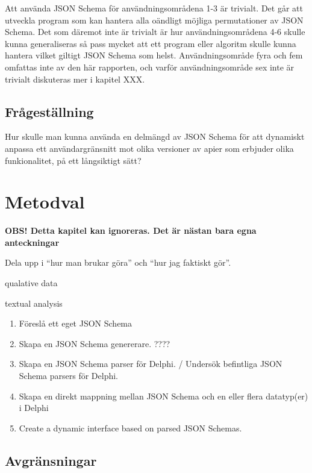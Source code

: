\documentclass[swedish]{kththesis}
\begin{document}
\noindent
Att använda JSON Schema för användningsområdena 1-3 är trivialt. Det går att utveckla program som kan hantera alla oändligt möjliga permutationer av JSON Schema. Det som däremot inte är trivialt är hur användningsområdena 4-6 skulle kunna generaliseras så pass mycket att ett program eller algoritm skulle kunna hantera vilket giltigt JSON Schema som helst. Användningsområde fyra och fem omfattas inte av den här rapporten, och varför användningsområde sex inte är trivialt diskuteras mer i kapitel XXX.




\section{Frågeställning}

Hur skulle man kunna använda en delmängd av JSON Schema för att dynamiskt anpassa ett användargränsnitt mot olika versioner av apier som erbjuder olika funkionalitet, på ett långsiktigt sätt?


\chapter{Metodval}

\textbf{OBS! Detta kapitel kan ignoreras. Det är nästan bara egna anteckningar}

Dela upp i \enquote{hur man brukar göra} och \enquote{hur jag faktiskt gör}.

qualative data

textual analysis

\begin{enumerate}
	\item Föreslå ett eget JSON Schema
	\item Skapa en JSON Schema genererare. ????
	\item Skapa en JSON Schema parser för Delphi. / Undersök befintliga JSON Schema parsers för Delphi.
	\item Skapa en direkt mappning mellan JSON Schema och en eller flera datatyp(er) i Delphi
	\item Create a dynamic interface based on parsed JSON Schemas.
\end{enumerate}

\section{Avgränsningar}
\end{document}

